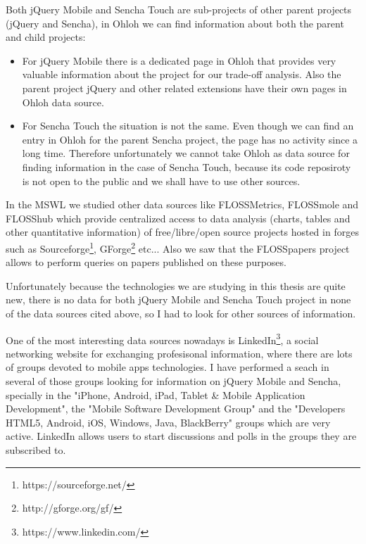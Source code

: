 \documentclass[a4paper,12pt]{book}
\begin{document}
Both jQuery Mobile and Sencha Touch are sub-projects of other parent projects (jQuery and Sencha), in Ohloh we can find information about both the parent and child projects:

\begin{itemize}
 \item For jQuery Mobile there is a dedicated page in Ohloh\cite{ojquery} that provides very valuable information about the project for our trade-off analysis. Also the parent project jQuery\cite{ojqueryparent} and other related extensions have their own pages in Ohloh data source.
 \item For Sencha Touch the situation is not the same. Even though we can find an entry in Ohloh for the parent Sencha project\cite{osencha}, the page has no activity since a long time. Therefore unfortunately we cannot take Ohloh as data source for finding information in the case of Sencha Touch, because its code reposiroty is not open to the public and we shall have to use other sources.
\end{itemize}

In the MSWL we studied other data sources like FLOSSMetrics\cite{FLOSSMetrics}, FLOSSmole\cite{FLOSSmole} and FLOSShub\cite{FLOSShub} which provide centralized access to data analysis (charts, tables and other quantitative information) of free/libre/open source projects hosted in forges such as Sourceforge\footnote{https://sourceforge.net/}, GForge\footnote{http://gforge.org/gf/} etc... Also we saw that the FLOSSpapers project\cite{FLOSSpapers} allows to perform queries on papers published on these purposes.

Unfortunately because the technologies we are studying in this thesis are quite new, there is no data for both jQuery Mobile and Sencha Touch project in none of the data sources cited above, so I had to look for other sources of information.

One of the most interesting data sources nowadays is LinkedIn\footnote{https://www.linkedin.com/},  a social networking website for exchanging profesisonal information, where there are lots of groups devoted to mobile apps technologies. I have performed a seach in several of those groups looking for information on jQuery Mobile and Sencha, specially in the "iPhone, Android, iPad, Tablet \& Mobile Application Development"\cite{linkedin1},  the "Mobile Software Development Group"\cite{linkedin2} and the "Developers HTML5, Android, iOS, Windows, Java, BlackBerry"\cite{linkedin3} groups which are very active. LinkedIn allows users to start discussions and polls in the groups they are subscribed to. 
\end{document}
